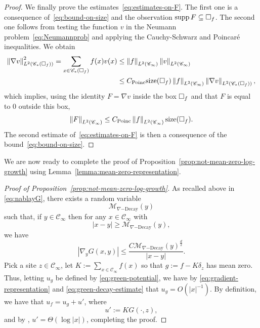 \documentclass[12pt]{amsart}
\numberwithin{equation}{section}
\begin{document}
\begin{proof}
		We finally prove the estimates~\eqref{eq:estimates-on-F}. The first one is a consequence of~\eqref{eq:bound-on-size} and the observation $\mathrm{supp\,} F \subseteq \square_f$. The second one follows from testing the function $v$ in the Neumann problem~\eqref{eq:Neumannprob} and applying the Cauchy-Schwarz and Poincar\'e inequalities. We obtain
		\begin{align*}
			\left\| \nabla v \right\|_{L^2 ( \mathscr{C}_*(\square_f))}^2  = \sum_{x \in \mathscr{C}_*(\square_f)} f(x) v(x) 
			& \leq \left\| f \right\|_{L^2(\mathscr{C}_\infty)} \left\| v \right\|_{L^2(\mathscr{C}_\infty)} \\
			& \leq  C_{\mathrm{Poinc}} \mathrm{size}(\square_f) \left\| f \right\|_{L^2(\mathscr{C}_\infty)} \left\| \nabla v \right\|_{L^2 ( \mathscr{C}_*(\square_f))},
		\end{align*}
		which implies, using the identity $F = \nabla v$ inside the box $\square_f$ and that $F$ is equal to $0$ outside this box,
		\begin{equation*}
			\left\| F \right\|_{L^2 ( \mathscr{C}_\infty)} \leq C_{\mathrm{Poinc}} \left\| f \right\|_{L^2(\mathscr{C}_\infty)}\mathrm{size}(\square_f).
		\end{equation*}
		The second estimate of~\eqref{eq:estimates-on-F} is then a consequence of the bound~\eqref{eq:bound-on-size}.
	\end{proof}
	
	We are now ready to complete the proof of Proposition~\ref{prop:not-mean-zero-log-growth} using Lemma~\ref{lemma:mean-zero-representation}.
	
	\begin{proof}[Proof of Proposition~\ref{prop:not-mean-zero-log-growth}]
		As recalled above in \eqref{eq:nablayG}, there exists a random variable 
		\[
		\mathcal{M}_{\nabla\mathrm{-Decay}}(y)
		\]
		such that, if $y \in \mathscr{C}_\infty$ then for any $x \in \mathscr{C}_\infty$ with 
		\[
		|x - y| \geq \mathcal{M}_{\nabla\mathrm{-Decay}}(y),
		\]
		we have 
		\begin{equation} \label{eq:green-decay-estimate}
			\left| \nabla_y G(x , y) \right| \leq \frac{C \mathcal{M}_{\nabla\mathrm{-Decay}}(y)^{\frac{d}{2}}}{|x - y|}.
		\end{equation}
		Pick a site $z \in \mathscr{C}_{\infty}$, let $K := \sum_{x \in \mathscr{C}_{\infty}} f(x)$ so that $g := f -  K \delta_z$ has mean zero. Thus, letting $u_g$ be defined by \eqref{eq:green-potential}, we have by  \eqref{eq:gradient-representation} and \eqref{eq:green-decay-estimate} that $u_g = O(|x|^{-1})$. By definition, we have that $u_f = u_g + u'$, where 
		\[
		u' :=  K  G(\cdot , z),
		\]
		and by \cite[Theorem 2]{dario-gu-green}, $u' = \Theta(\log |x|)$, completing the proof. 
	\end{proof}
	
\end{document}
